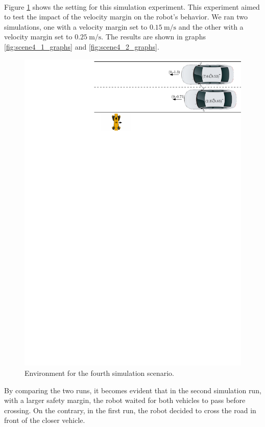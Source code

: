         \\
            Figure \ref{fig:scene4} shows the setting for this simulation experiment. This experiment aimed to test the impact of the velocity margin on the robot's behavior. We ran two simulations, one with a velocity margin set to $0.15\:\si{\m\per\s}$ and the other with a velocity margin set to $0.25\:\si{\m\per\s}$. The results are shown in graphs \ref{fig:scene4_1_graphs} and \ref{fig:scene4_2_graphs}.\\
            \begin{figure}[H]
                \centering
                \includegraphics[width=0.95\linewidth]{images/simulations/scene4.pdf}
                \caption{Environment for the fourth simulation scenario.}
                \label{fig:scene4}
            \end{figure}
            By comparing the two runs, it becomes evident that in the second simulation run, with a larger safety margin, the robot waited for both vehicles to pass before crossing. On the contrary, in the first run, the robot decided to cross the road in front of the closer vehicle.\\
